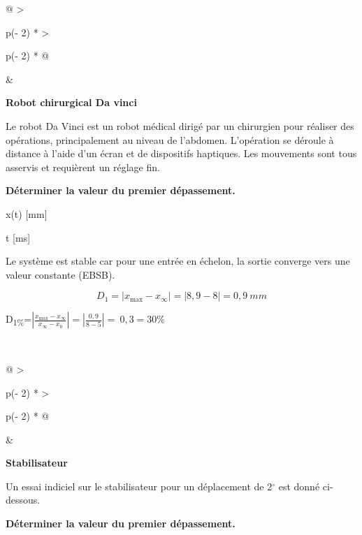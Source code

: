 \begin{longtable}[]{@{}
  >{\raggedright\arraybackslash}p{(\columnwidth - 2\tabcolsep) * }
  >{\raggedright\arraybackslash}p{(\columnwidth - 2\tabcolsep) * }@{}}
\toprule\noalign{}
\begin{minipage}[b]{\linewidth}\raggedright
\begin{quote}
\end{quote}
\end{minipage} & \begin{minipage}[b]{\linewidth}\raggedright
\textbf{Robot chirurgical Da vinci}

Le
robot Da Vinci est un robot médical dirigé par un chirurgien pour
réaliser des opérations, principalement au niveau de l'abdomen.
L'opération se déroule à distance à l'aide d'un écran et de dispositifs
haptiques. Les mouvements sont tous asservis et requièrent un réglage
fin.

\textbf{Déterminer la valeur du premier dépassement.}

x(t) {[}mm{]}


t {[}ms{]}

Le système est stable car pour une entrée en échelon, la sortie converge
vers une valeur constante (EBSB).

\[D_{1} = \left| x_{\max} - x_{\infty} \right| = |8,9 - 8| = 0,9\ mm\]

D\textsubscript{1\%}=\(\left| \frac{x_{\max} - x_{\infty}}{x_{\infty} - x_{0}} \right| = \left| \frac{0,9}{8 - 5} \right| = \ 0,3 = 30\%\)
\end{minipage} \\
\midrule\noalign{}
\endhead
\bottomrule\noalign{}
\endlastfoot
\end{longtable}

\begin{longtable}[]{@{}
  >{\raggedright\arraybackslash}p{(\columnwidth - 2\tabcolsep) * }
  >{\raggedright\arraybackslash}p{(\columnwidth - 2\tabcolsep) * }@{}}
\toprule\noalign{}
\begin{minipage}[b]{\linewidth}\raggedright
\begin{quote}
\end{quote}
\end{minipage} & \begin{minipage}[b]{\linewidth}\raggedright
\textbf{Stabilisateur}

Un essai indiciel sur le stabilisateur pour un déplacement de 2$^\circ$ est
donné ci-dessous.


\textbf{Déterminer la valeur du premier dépassement.}
\end{minipage} \\
\midrule\noalign{}
\endhead
\bottomrule\noalign{}
\endlastfoot
\end{longtable}

